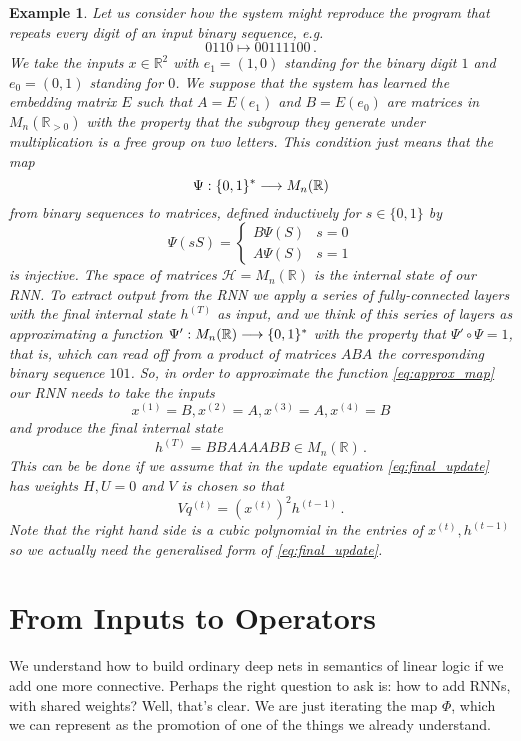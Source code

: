 \documentclass[english,letter paper,12pt,leqno]{article}
\theoremstyle{example}
\newtheorem{example}[theorem]{Example}
\numberwithin{equation}{section}
\def\be{\begin{equation}}
\def\ee{\end{equation}}
\begin{document}
\begin{example} Let us consider how the system might reproduce the program that repeats every digit of an input binary sequence, e.g.
\be\label{eq:approx_map}
0110 \longmapsto 00111100\,.
\ee
We take the inputs $x \in \mathbb{R}^2$ with $e_1 = (1,0)$ standing for the binary digit $1$ and $e_0 = (0,1)$ standing for $0$. We suppose that the system has learned the embedding matrix $E$ such that $A = E(e_1)$ and $B = E(e_0)$ are matrices in $M_n(\mathbb{R}_{>0})$ with the property that the subgroup they generate under multiplication is a free group on two letters. This condition just means that the map
\[
\Psi: \{0,1\}^* \longrightarrow M_n( \mathbb{R} )
\]
from binary sequences to matrices, defined inductively for $s \in \{0,1\}$ by
\[
\Psi( s S ) = \begin{cases} B \Psi(S) & s = 0 \\ A \Psi(S) & s = 1 \end{cases}
\]
is injective. The space of matrices $\mathscr{H} = M_n(\mathbb{R})$ is the internal state of our RNN. To extract output from the RNN we apply a series of fully-connected layers with the final internal state $h^{(T)}$ as input, and we think of this series of layers as approximating a function $\Psi': M_n(\mathbb{R}) \longrightarrow \{0,1\}^*$ with the property that $\Psi' \circ \Psi = 1$, that is, which can read off from a product of matrices $ABA$ the corresponding binary sequence $101$. So, in order to approximate the function \eqref{eq:approx_map} our RNN needs to take the inputs
\[
x^{(1)} = B, x^{(2)} = A, x^{(3)} = A, x^{(4)} = B
\]
and produce the final internal state
\[
h^{(T)} = BBAAAABB \in M_n(\mathbb{R})\,.
\]
This can be be done if we assume that in the update equation \eqref{eq:final_update} has weights $H, U = 0$ and $V$ is chosen so that
\[
V q^{(t)} = (x^{(t)})^2 h^{(t-1)}\,.
\]
Note that the right hand side is a cubic polynomial in the entries of $x^{(t)}, h^{(t-1)}$ so we actually need the generalised form of \eqref{eq:final_update}.
\end{example}

\newpage

\appendix

\section{From Inputs to Operators}

We understand how to build ordinary deep nets in semantics of linear logic if we add one more connective. Perhaps the right question to ask is: how to add RNNs, with shared weights? Well, that's clear. We are just iterating the map $\Phi$, which we can represent as the promotion of one of the things we already understand. 
\end{document}
